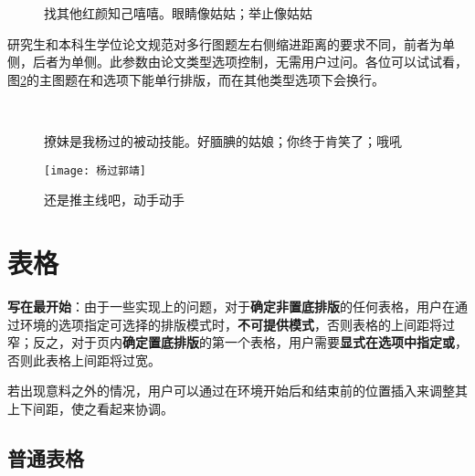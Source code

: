 \documentclass[doctor, vlined]{DissertUESTC}
\begin{document}
	\begin{figure}[!htb]
		\centering
		\hfill
		\subfloat[]{
			\texttt{[image: 程英3]}
			\label{fig: 程英3}
		}
		\caption{找其他红颜知己嘻嘻。眼睛像姑姑；举止像姑姑} \label{fig: 红颜知己}
	\end{figure}
	
	研究生和本科生学位论文规范对多行图题左右侧缩进距离的要求不同，前者为单侧\shad{4em}，后者为单侧\shad{2em}。此参数由论文类型选项控制，无需用户过问。各位可以试试看，图\ref{fig: 被动技能}的主图题在和选项下能单行排版，而在其他类型选项下会换行。

	\begin{figure}[!htb]
		\centering
		\subfloat[]{
			\texttt{[image: 绿萼2]}
			\label{fig: 绿萼2}
		}
		\hfill
		\\
		\caption{撩妹是我杨过的被动技能。好腼腆的姑娘；你终于肯笑了；哦吼} \label{fig: 被动技能}
	\end{figure}
	
	\begin{figure}[!htb]
		\centering
		\texttt{[image: 杨过郭靖]}
		\caption{还是推主线吧，动手动手}
	\end{figure}
	
	\clearpage
	\section{表格}

	\textbf{写在最开始}：由于一些实现上的问题，对于\textbf{确定非置底排版}的任何表格，用户在通过环境的选项指定可选择的排版模式时，\textbf{\color{DarkRed}不可提供模式}，否则表格的上间距将过窄；反之，对于页内\textbf{确定置底排版}的第一个表格，用户需要\textbf{\color{DarkRed}显式在选项中指定或}，否则此表格上间距将过宽。

	若出现意料之外的情况，用户可以通过在环境开始后和结束前的位置插入来调整其上下间距，使之看起来协调。
	
	\subsection{普通表格}
	
\end{document}
